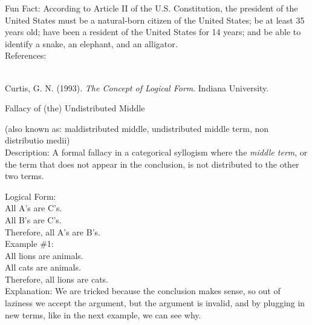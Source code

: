 \documentclass[a4paper,12pt,single,pdftex]{scrbook}
\begin{document}
    
      Fun Fact: According to Article II of the U.S. Constitution, the president of the United States must be a natural-born citizen of the United States; be at least 35 years old; have been a resident of the United States for 14 years; and be able to identify a snake, an elephant, and an alligator.
    \\

    References:

    
      
        
      \\

      
        
          Curtis, G. N. (1993). {\it The Concept of Logical Form}. Indiana University.
        
      
    
  

Fallacy of (the) Undistributed Middle
    
      (also known as: maldistributed middle, undistributed middle term, non distributio medii)
    \\

  
    Description: A formal fallacy in a categorical syllogism where the {\it middle term}, or the term that does not appear in the conclusion, is not distributed to the other two terms.

    
      Logical Form:
    \\

    
      All A's are C's.
    \\

    
      All B's are C's.
    \\

    
      Therefore, all A’s are B’s.
    \\

    
      Example \#1:
    \\

    
      All lions are animals.
    \\

    
      All cats are animals.
    \\

    
      Therefore, all lions are cats.
    \\

    
      Explanation: We are tricked because the conclusion makes sense, so out of laziness we accept the argument, but the argument is invalid, and by plugging in new terms, like in the next example, we can see why.
    \\
\end{document}
